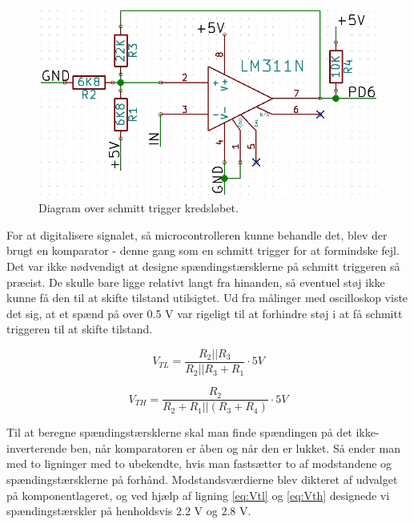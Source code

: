 \begin{figure}[h]

	\centering
		\includegraphics[scale=0.3]{Billeder/Schmitt.jpg}
	\caption{Diagram over schmitt trigger kredsløbet.}
	\label{fig:Schmitt}
	
\end{figure}

For at digitalisere signalet, så microcontrolleren kunne behandle det, blev der brugt en komparator - denne gang som en schmitt trigger for at formindske fejl. Det var ikke nødvendigt at designe spændingstærsklerne på schmitt triggeren så præcist. De skulle bare ligge relativt langt fra hinanden, så eventuel støj ikke kunne få den til at skifte tilstand utilsigtet. Ud fra  målinger med oscilloskop viste det sig, at et spænd på over 0.5 V var rigeligt til at forhindre støj i at få schmitt triggeren til at skifte tilstand.

\begin{equation}
V_{TL} = \dfrac{R_{2}||R_{3}}{R_{2}||R_{3}+R_{1}} \cdot 5V
\label{eq:Vtl}
\end{equation}


\begin{equation}
V_{TH} = \dfrac{R_{2}}{R_{2}+R_{1}||(R_{3}+R_{4})} \cdot 5V
\label{eq:Vth}
\end{equation}



Til at beregne spændingstærsklerne skal man finde spændingen på det ikke-inverterende ben, når komparatoren er åben og når den er lukket. Så ender man med to ligninger med to ubekendte, hvis man fastsætter to af modstandene og spændingstærsklerne på forhånd. Modstandsværdierne blev dikteret af udvalget på komponentlageret, og ved hjælp af ligning \eqref{eq:Vtl} og \eqref{eq:Vth} designede vi spændingstærskler på henholdsvis 2.2 V og 2.8 V. 

